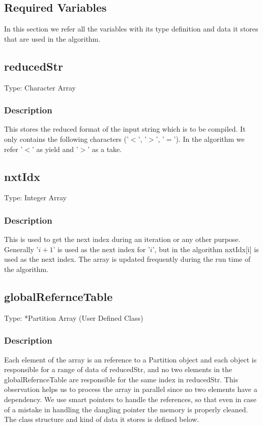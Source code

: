 \documentclass{article}
\begin{document}
 \begin{flushleft}

\section{Required Variables}

In this section we refer all the variables with its type definition and 
data it stores that are used in the algorithm.

\subsection{reducedStr}

Type: Character Array

\subsubsection*{Description}
This stores the reduced format of the input string which is to be compiled.
It only contains the following characters ('$<$', '$>$', '$=$'). In the algorithm we refer
'$<$' as yield and '$>$' as a take.

\subsection{nxtIdx}

Type: Integer Array

\subsubsection*{Description}
This is used to get the next index during an iteration or any other purpose.
Generally '$i + 1$' is used as the next index for '$i$', but in the algorithm nxtIdx[i] 
is used as the next index. The array is updated frequently during the run time
of the algorithm.

\subsection{globalRefernceTable}

Type: *Partition Array (User Defined Class)

\subsubsection*{Description}
Each element of the array is an reference to a Partition object and each object is responsible for a range of data of reducedStr, and no two elements in the globalRefernceTable are responsible for the same index in  reducedStr. This 
observation helps us to process the array in parallel since no two elements have a dependency. 
\linebreak\linebreak
We use smart pointers to handle the references, so that even in case of a mistake 
in handling the dangling pointer the memory is properly cleaned. The class structure and kind of data it stores is defined below. 


\end{flushleft}
\end{document}
